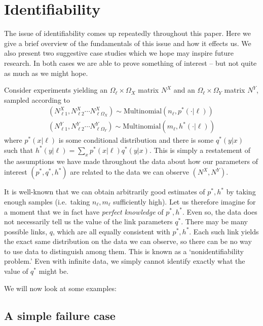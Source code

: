 \section{Identifiability}

\label{sec:casestudies}

The issue of identifiability comes up repeatedly throughout this paper.  Here we give a brief overview of the fundamentals of this issue and how it effects us.  We also present two suggestive case studies which we hope may inspire future research.  In both cases we are able to prove something of interest -- but not quite as much as we might hope.  

Consider experiments yielding an $\Omega_\ell\times\Omega_X$ matrix $N^X$ and an $\Omega_\ell \times \Omega_Y$ matrix $N^Y$, sampled according to
\begin{align*}
(N^X_{\ell 1},N^X_{\ell 2}\cdots N^X_{\ell \Omega_X}) \sim \mathrm{Multinomial}(n_\ell,p^*(\cdot | \ell))\\
(N^Y_{\ell 1},N^Y_{\ell 2}\cdots N^Y_{\ell \Omega_Y}) \sim \mathrm{Multinomial}(m_\ell,h^*(\cdot | \ell))
\end{align*}
where $p^*(x|\ell)$ is some conditional distribution and there is some $q^*(y|x)$ such that $h^*(y|\ell)=\sum_x p^*(x|\ell)q^*(y|x)$.  This is simply a restatement of the assumptions we have made throughout the data about how our parameters of interest $(p^*,q^*,h^*)$ are related to the data we can observe $(N^X,N^Y)$.

It is well-known that we can obtain arbitrarily good estimates of $p^*,h^*$ by taking enough samples (i.e.\ taking $n_\ell,m_\ell$ sufficiently high).  Let us therefore imagine for a moment that we in fact have \emph{perfect knowledge} of $p^*,h^*$.  Even so, the data does not necessarily tell us the value of the link parameters $q^*$.  There may be many possible links, $q$, which are all equally consistent with $p^*,h^*$.  Each such link yields the exact same distribution on the data we can observe, so there can be no way to use data to distinguish among them.  This is known as a `nonidentifiability problem.'  Even with infinite data, we simply cannot identify exactly what the value of $q^*$ might be.

We will now look at some examples:

\subsection{A simple failure case}

